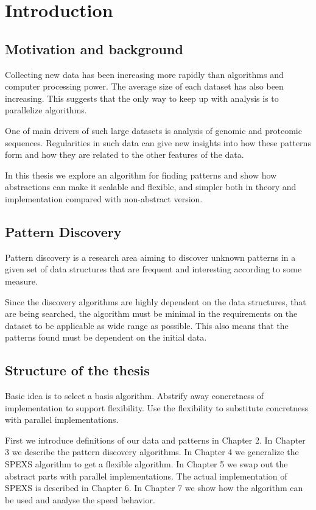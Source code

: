 \chapter{Introduction}

\section{Motivation and background}

Collecting new data has been increasing more rapidly than algorithms and
computer processing power. The average size of each dataset has also
been increasing. This suggests that the only way to keep up with
analysis is to parallelize algorithms.

One of main drivers of such large datasets is analysis
of genomic and proteomic sequences. Regularities in such data can 
give new insights into how these patterns form and how 
they are related to the other features of the data.


In this thesis we explore an algorithm for finding patterns and show how
abstractions can make it scalable and flexible, and simpler both in 
theory and implementation compared with non-abstract version.

\section{Pattern Discovery}

Pattern discovery is a research area aiming to discover unknown patterns
in a given set of data structures that are frequent and interesting according 
to some measure.

Since the discovery algorithms are highly dependent on the
data structures, that are being searched, the algorithm must be minimal
in the requirements on the dataset to be applicable as wide range as possible.
This also means that the patterns found must be dependent on the initial data.

\section{Structure of the thesis}

Basic idea is to select a basis algorithm. Abstrify away concretness of 
implementation to support flexibility. Use the flexibility to substitute 
concretness with parallel implementations.


First we introduce definitions of our data and patterns in Chapter 2. In
Chapter 3 we describe the pattern discovery algorithms.
In Chapter 4 we generalize the SPEXS algorithm to get a flexible
algorithm. In Chapter 5 we swap out the abstract parts with parallel implementations.
The actual implementation of SPEXS is described in Chapter 6. In Chapter 7 we 
show how the algorithm can be used and analyse the speed behavior.